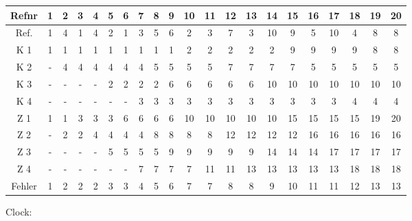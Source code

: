 \begin{enumerate}[a)]
\begin{note}
\begin{tabular}{|c||c|c|c|c|c|c|c|c|c|c|c|c|c|c|c|c|c|c|c|c|}
	\hline
	\rowcolor{lightgray} Refnr & 1 & 2 & 3 & 4 & 5 & 6 & 7 & 8 & 9 & 10 & 11 & 12 & 13 & 14 & 15 & 16 & 17 & 18 & 19 & 20 \\
	\hline
	\rowcolor{lightgray} Ref. & 1 & 4 & 1 & 4 & 2 & 1 & 3 & 5 & 6 & 2 & 3 & 7 & 3 & 10 & 9 & 5 & 10 & 4 & 8 & 8 \\
	\hline \hline
	K 1 & \color{blue} 1 & 1 & \color{blue} 1 & 1 & 1 & \color{blue} 1 & 1 & 1 & 1 & \color{blue} 2 & 2 & 2 & 2 & 2 & \color{blue} 9 & 9 & 9 & 9 & \color{blue} 8 & \color{blue} 8 \\
	\hline
	K 2 & - & \color{blue} 4 & 4 & \color{blue} 4 & 4 & 4 & 4 & \color{blue} 5 & 5 & 5 & 5 & \color{blue} 7 & 7 & 7 & 7 & \color{blue} 5 & 5 & 5 & 5 & 5 \\
	\hline
	K 3 & - & - & - & - & \color{blue} 2 & 2 & 2 & 2 & \color{blue} 6 & 6 & 6 & 6 & 6 & \color{blue} 10 & 10 & 10 & \color{blue} 10 & 10 & 10 & 10 \\
	\hline
	K 4 & - & - & - & - & - & - & \color{blue} 3 & 3 & 3 & 3 & \color{blue} 3 & 3 & \color{blue} 3 & 3 & 3 & 3 & 3 & \color{blue} 4 & 4 & 4 \\
	\hline \hline
	\rowcolor{lightgray} Z 1 & \color{blue} 1 & 1 & \color{blue} 3 & 3 & 3 & \color{blue} 6 & 6 & 6 & 6 & \color{blue} 10 & 10 & 10 & 10 & 10 & \color{blue} 15 & 15 & 15 & 15 & \color{blue} 19 & \color{blue} 20 \\
	\hline
	\rowcolor{lightgray} Z 2 & - & \color{blue} 2 & 2 & \color{blue} 4 & 4 & 4 & 4 & \color{blue} 8 & 8 & 8 & 8 & \color{blue} 12 & 12 & 12 & 12 & \color{blue} 16 & 16 & 16 & 16 & 16 \\
	\hline
	\rowcolor{lightgray} Z 3 & - & - & - & - & \color{blue} 5 & 5 & 5 & 5 & \color{blue} 9 & 9 & 9 & 9 & 9 & \color{blue} 14 & 14 & 14 & \color{blue} 17 & 17 & 17 & 17 \\
	\hline
	\rowcolor{lightgray} Z 4 & - & - & - & - & - & - & \color{blue} 7 & 7 & 7 & 7 & \color{blue} 11 & 11 & \color{blue} 13 & 13 & 13 & 13 & 13 & \color{blue} 18 & 18 & 18 \\
	\hline \hline
	Fehler & 1 & 2 & 2 & 2 & 3 & 3 & 4 & 5 & 6 & 7 & 7 & 8 & 8 & 9 & 10 & 11 & 11 & 12 & 13 & 13 \\
	\hline
\end{tabular}

Clock:\nopagebreak


\end{note}
\end{enumerate}
